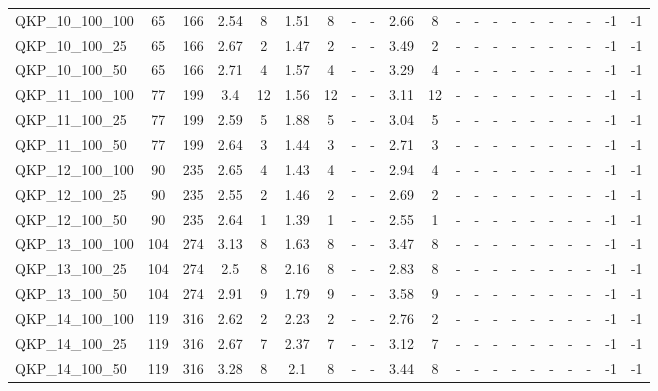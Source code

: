 \begin{sidewaystable}[!ht]
{\begin{tabular}{lcccccccccccccccccccc}
QKP\_10\_100\_100 & 65 & 166 & 2.54 & 8 &  \textcolor{blue2}{1.51} & 8 &  - &  - & 2.66 & 8 &  - &  - &  - &  - &  - &  - &  - &  - & -1 & -1 \\
QKP\_10\_100\_25 & 65 & 166 & 2.67 & 2 &  \textcolor{blue2}{1.47} & 2 &  - &  - & 3.49 & 2 &  - &  - &  - &  - &  - &  - &  - &  - & -1 & -1 \\
QKP\_10\_100\_50 & 65 & 166 & 2.71 & 4 &  \textcolor{blue2}{1.57} & 4 &  - &  - & 3.29 & 4 &  - &  - &  - &  - &  - &  - &  - &  - & -1 & -1 \\
QKP\_11\_100\_100 & 77 & 199 & 3.4 & 12 &  \textcolor{blue2}{1.56} & 12 &  - &  - & 3.11 & 12 &  - &  - &  - &  - &  - &  - &  - &  - & -1 & -1 \\
QKP\_11\_100\_25 & 77 & 199 & 2.59 & 5 &  \textcolor{blue2}{1.88} & 5 &  - &  - & 3.04 & 5 &  - &  - &  - &  - &  - &  - &  - &  - & -1 & -1 \\
QKP\_11\_100\_50 & 77 & 199 & 2.64 & 3 &  \textcolor{blue2}{1.44} & 3 &  - &  - & 2.71 & 3 &  - &  - &  - &  - &  - &  - &  - &  - & -1 & -1 \\
QKP\_12\_100\_100 & 90 & 235 & 2.65 & 4 &  \textcolor{blue2}{1.43} & 4 &  - &  - & 2.94 & 4 &  - &  - &  - &  - &  - &  - &  - &  - & -1 & -1 \\
QKP\_12\_100\_25 & 90 & 235 & 2.55 & 2 &  \textcolor{blue2}{1.46} & 2 &  - &  - & 2.69 & 2 &  - &  - &  - &  - &  - &  - &  - &  - & -1 & -1 \\
QKP\_12\_100\_50 & 90 & 235 & 2.64 & 1 &  \textcolor{blue2}{1.39} & 1 &  - &  - & 2.55 & 1 &  - &  - &  - &  - &  - &  - &  - &  - & -1 & -1 \\
QKP\_13\_100\_100 & 104 & 274 & 3.13 & 8 &  \textcolor{blue2}{1.63} & 8 &  - &  - & 3.47 & 8 &  - &  - &  - &  - &  - &  - &  - &  - & -1 & -1 \\
QKP\_13\_100\_25 & 104 & 274 & 2.5 & 8 &  \textcolor{blue2}{2.16} & 8 &  - &  - & 2.83 & 8 &  - &  - &  - &  - &  - &  - &  - &  - & -1 & -1 \\
QKP\_13\_100\_50 & 104 & 274 & 2.91 & 9 &  \textcolor{blue2}{1.79} & 9 &  - &  - & 3.58 & 9 &  - &  - &  - &  - &  - &  - &  - &  - & -1 & -1 \\
QKP\_14\_100\_100 & 119 & 316 & 2.62 & 2 &  \textcolor{blue2}{2.23} & 2 &  - &  - & 2.76 & 2 &  - &  - &  - &  - &  - &  - &  - &  - & -1 & -1 \\
QKP\_14\_100\_25 & 119 & 316 & 2.67 & 7 &  \textcolor{blue2}{2.37} & 7 &  - &  - & 3.12 & 7 &  - &  - &  - &  - &  - &  - &  - &  - & -1 & -1 \\
QKP\_14\_100\_50 & 119 & 316 & 3.28 & 8 &  \textcolor{blue2}{2.1} & 8 &  - &  - & 3.44 & 8 &  - &  - &  - &  - &  - &  - &  - &  - & -1 & -1 \\

\end{tabular}}
\end{sidewaystable}
